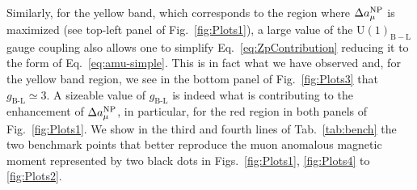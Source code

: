 \documentclass[a4paper,11pt]{article}
\renewcommand{\(}{\left(}
\renewcommand{\)}{\right)}
\renewcommand{\[}{\left[}
\renewcommand{\]}{\right]}
\newcommand{\U}[1]{\mathrm{U}(1)_{\mathrm{#1}}}			%
\newcommand{\ro}[1]{\textrm{#1}}
\begin{document}
Similarly, for the yellow band, which corresponds to the region where $\Delta a_\mu^{\rm NP}$ is maximized (see top-left panel of Fig.~\ref{fig:Plots1}), a large value of the $\U{B-L}$ gauge coupling also allows one to simplify Eq.~\eqref{eq:ZpContribution} reducing it to the form of Eq.~\eqref{eq:amu-simple}. This is in fact what we have observed and, for the yellow band region, we see in the bottom panel of Fig.~\ref{fig:Plots3} that $g_\ro{B-L} \simeq 3$. A sizeable value of $g_\ro{B-L}$ is indeed what is contributing to the enhancement of $\Delta a_\mu^{\rm NP}$, in particular, for the red region in both panels of Fig.~\ref{fig:Plots1}. We show in the third and fourth lines of Tab.~\ref{tab:bench} the two benchmark points that better reproduce the muon anomalous magnetic moment represented by two black dots in
Figs.~\ref{fig:Plots1}, \ref{fig:Plots4} to \ref{fig:Plots2}.
\end{document}
